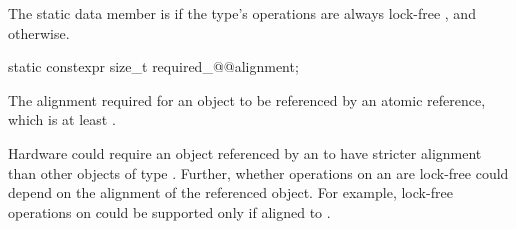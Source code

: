\begin{itemdescr}
\pnum
The static data member  is 
if the  type's operations are always lock-free
,
and  otherwise.
\end{itemdescr}

\begin{itemdecl}
static constexpr size_t required_@@alignment;
\end{itemdecl}

\begin{itemdescr}
\pnum
The alignment required for an object to be referenced  by an atomic reference,
which is at least . 

\pnum
\begin{note}
Hardware could require an object
referenced by an 
to have stricter alignment
than other objects of type .
Further, whether operations on an 
are lock-free could depend on the alignment of the referenced object.
For example, lock-free operations on 
could be supported only if aligned to .
\end{note}
\end{itemdescr}


